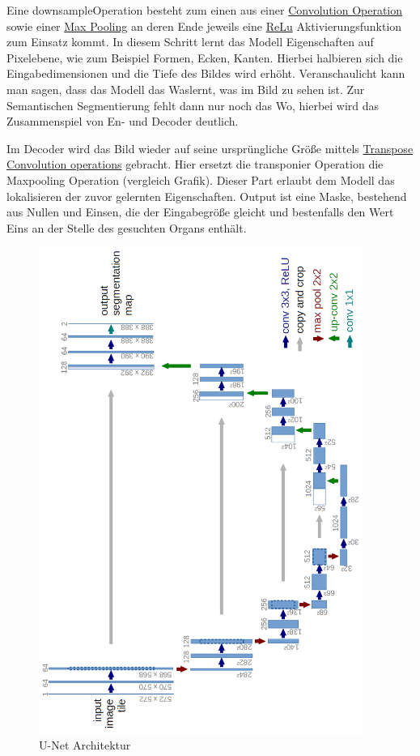 Eine \glqq downsample\grqq  Operation besteht zum einen aus einer
\glqq \href{https://en.wikipedia.org/wiki/Convolution}{Convolution Operation}\grqq
sowie einer
\glqq \href{https://computersciencewiki.org/index.php/Max-pooling_/_Pooling}{Max Pooling}\grqq
an deren Ende jeweils eine
 \glqq \href{https://deepai.org/machine-learning-glossary-and-terms/relu}{ReLu}\grqq
 Aktivierungsfunktion zum Einsatz kommt. In diesem Schritt lernt das Modell Eigenschaften auf Pixelebene, wie zum Beispiel Formen, Ecken, Kanten. Hierbei halbieren sich die Eingabedimensionen und die Tiefe des Bildes wird erhöht. Veranschaulicht kann man sagen, dass das Modell das \glqq Was\grqq lernt, was im Bild zu sehen ist. \citep{Con97} Zur Semantischen Segmentierung fehlt dann nur noch das  \glqq Wo\grqq, hierbei wird das Zusammenspiel von En- und Decoder deutlich.

Im Decoder wird das Bild wieder auf seine ursprüngliche Größe mittels 
\glqq \href{https://en.wikipedia.org/wiki/Deconvolution}{Transpose Convolution operations}\grqq  
gebracht. Hier ersetzt die transponier Operation die Maxpooling Operation (vergleich Grafik). Dieser Part erlaubt dem Modell das lokalisieren der zuvor gelernten Eigenschaften. Output ist eine Maske, bestehend aus Nullen und Einsen, die der Eingabegröße gleicht und bestenfalls den Wert Eins an der Stelle des gesuchten Organs enthält.

\begin{figure}[htb]
	\begin{center}
		\includegraphics[width=300pt, angle=270]{bilder/u-net-architecture}
		\caption{U-Net Architektur}\label{Fig:unet-diagram}
	\end{center}
\end{figure}


